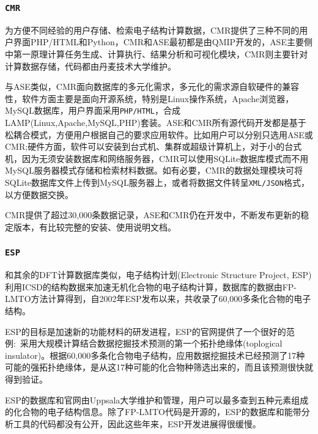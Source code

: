 \subsubsection{\tt{CMR}}
为方便不同经验的用户存储、检索电子结构计算数据，\textrm{CMR}提供了三种不同的用户界面\textrm{PHP/HTML和Python}\cite{CMR_URL}，\textrm{CMR}和\textrm{ASE}最初都是由\textrm{QMIP}开发的\cite{CSE14-51_2012}，\textrm{ASE}主要侧中第一原理计算任务生成、计算执行、结果分析和可视化模块，\textrm{CMR}则主要针对计算数据存储，代码都由丹麦技术大学维护。

与\textrm{ASE}类似，\textrm{CMR}面向数据库的多元化需求，多元化的需求源自软硬件的兼容性，软件方面主要是面向开源系统，特别是\textrm{Linux}操作系统，\textrm{Apache}浏览器，\textrm{MySQL}数据库，用户界面采用\texttt{PHP/HTML}，合成\textrm{LAMP}(\textrm{Linux,Apache,MySQL,PHP})套装。\textrm{ASE}和\textrm{CMR}所有源代码开发都是基于松耦合模式，方便用户根据自己的要求应用软件。比如用户可以分别只选用\textrm{ASE}或\textrm{CMR};硬件方面，软件可以安装到台式机、集群或超级计算机上，对于小的台式机，因为无须安装数据库和网络服务器，\textrm{CMR}可以使用\textrm{SQLite}数据库模式而不用\textrm{MySQL}服务器模式存储和检索材料数据。如有必要，\textrm{CMR}的数据处理模块可将\textrm{SQLite}数据库文件上传到\textrm{MySQL}服务器上，或者将数据文件转呈\texttt{XML/JSON}格式，以方便数据交换。

\textrm{CMR}提供了超过30,000条数据记录，\textrm{ASE}和\textrm{CMR}仍在开发中，不断发布更新的稳定版本，有比较完整的安装、使用说明文档。

\subsubsection{\tt{ESP}}
和其余的\textrm{DFT}计算数据库类似，电子结构计划\textrm{(Electronic Structure Project, ESP)}利用\textrm{ICSD}的结构数据来加速无机化合物的电子结构计算\cite{ESP_URL,CMS44-1042_2009}，数据库的数据由\textrm{FP-LMTO}方法计算得到，自2002年\textrm{ESP}发布以来，共收录了60,000多条化合物的电子结构。

\textrm{ESP}的目标是加速新的功能材料的研发进程，\textrm{ESP}的官网提供了一个很好的范例:~采用大规模计算结合数据挖掘技术预测的第一个拓扑绝缘体\textrm{(toplogical insulator)}。根据60,000多条化合物电子结构，应用数据挖掘技术已经预测了17种可能的强拓扑绝缘体\cite{arXiv1007-4838,APR6-31_2014}，是从这17种可能的化合物种筛选出来的，而且该预测很快就得到验证。

\textrm{ESP}的数据库和官网由\textrm{Uppsala}大学维护和管理，用户可以最多查到五种元素组成的化合物的电子结构信息。除了\textrm{FP-LMTO}代码是开源的，\textrm{ESP}的数据库和能带分析工具的代码都没有公开，因此这些年来，\textrm{ESP}开发进展得很缓慢。

